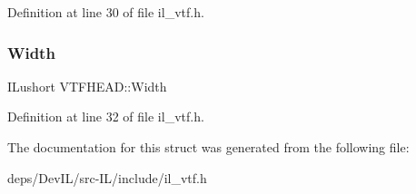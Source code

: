 Definition at line 30 of file il\+\_\+vtf.\+h.

\mbox{\label{structVTFHEAD_ad6f34374e9c49551d44fdf1a2aea2b12}} 
\subsubsection{\texorpdfstring{Width}{Width}}
{\footnotesize\ttfamily I\+Lushort V\+T\+F\+H\+E\+A\+D\+::\+Width}



Definition at line 32 of file il\+\_\+vtf.\+h.



The documentation for this struct was generated from the following file\+:\begin{DoxyCompactItemize}
\item 
deps/\+Dev\+I\+L/src-\/\+I\+L/include/il\+\_\+vtf.\+h\end{DoxyCompactItemize}
